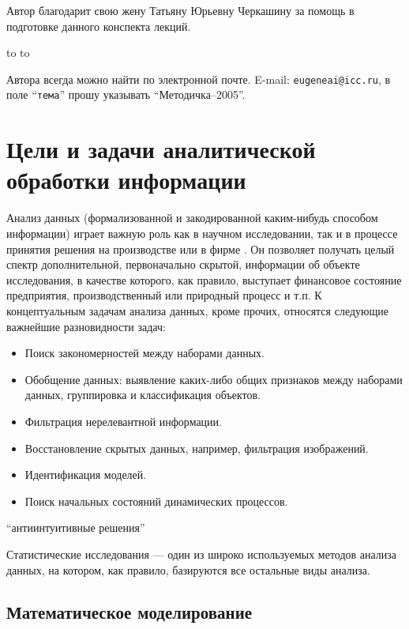 \documentclass[12pt, openany, twoside]{book} %
\begin{document}
Автор благодарит свою жену Татьяну Юрьевну Черкашину за помощь в подготовке
данного конспекта лекций.

\medskip
\noindent\hbox to \linewidth{\hfill\sf И.о.зав.лаб. ИДСТУ СО РАН, и.о.доцента кафедры ВТ
ИрГТУ,}
\noindent\hbox to \linewidth{\hfill\sf к.т.н. Е.А.Черкашин}

\vfill
\makeatletter
{} Автора всегда можно найти по электронной почте. E-mail:
{\tt eugeneai@icc.ru}, в поле ``{\tt тема}'' прошу указывать ``Методичка--2005''.
\makeatother

\chapter{Цели и задачи аналитической обработки информации}

Анализ данных (формализованной и закодированной каким-нибудь способом информации) играет важную роль как в научном исследовании, так и в процессе принятия решения на производстве или в фирме . Он позволяет получать целый спектр дополнительной, первоначально скрытой,  информации об объекте исследования, в качестве которого, как правило, выступает финансовое состояние предприятия, производственный или природный процесс и т.п. К концептуальным задачам анализа данных, кроме прочих, относятся следующие важнейшие разновидности задач:
\begin{itemize}
\item Поиск закономерностей между наборами данных.
\item Обобщение данных: выявление каких-либо общих признаков между наборами данных, группировка и классификация объектов.
\item Фильтрация нерелевантной информации.
\item Восстановление скрытых данных, например, фильтрация изображений.
\item Идентификация моделей.
\item Поиск начальных состояний динамических процессов.
\end{itemize}

``антиинтуитивные решения''

Статистические исследования --– один из широко используемых методов анализа данных, на котором, как правило, базируются все остальные виды анализа.
\section{Математическое моделирование}
\end{document}
